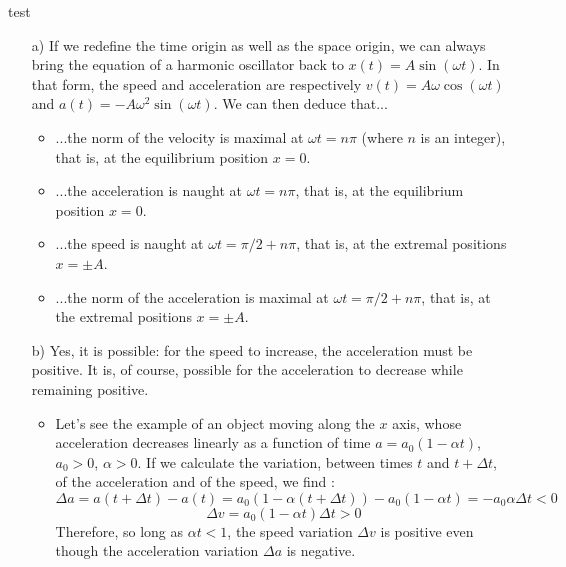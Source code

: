 %
%

\begin{center}
\vspace*{5mm}
\end{center}

test
\begin{enumerate}
\item[a)] If we redefine the time origin as well as the space origin, we can always bring the equation of a harmonic oscillator back to $x(t)=A\sin(\omega t)$. In that form, the speed and acceleration are respectively $v(t)=A\omega \cos(\omega t)$ and $a(t)=-A\omega^2\sin(\omega t)$. We can then deduce that...
\begin{itemize}
\item ...the norm of the velocity is maximal at $\omega t=n\pi$ (where $n$ is an integer), that is, at the equilibrium position $x=0$.
\item ...the acceleration is naught at  $\omega t=n\pi$, that is, at the equilibrium position $x=0$.
\item ...the speed is naught at $\omega t=\pi/2+n\pi$, that is, at the extremal positions $x=\pm A$. 
\item ...the norm of the acceleration is maximal at $\omega t=\pi/2+n\pi$, that is, at the extremal positions $x=\pm A$. 
\end{itemize}
\item[b)] Yes, it is possible: for the speed to increase, the acceleration must be positive. It is, of course, possible for the acceleration to decrease while remaining positive. 
\begin{itemize}
\item Let's see the example of an object moving along the $x$ axis, whose acceleration decreases linearly as a function of time $a=a_0(1-\alpha t)$, $a_0>0$, $\alpha >0$. If we calculate the variation, between times $t$ and   $t+\Delta t$, of the acceleration and of the speed, we find :
$$\Delta a=a(t+\Delta t)-a(t)=a_0(1-\alpha(t+\Delta t))-a_0(1-\alpha t)=-a_0 \alpha \Delta t <0$$
$$
\Delta v=a_0 (1-\alpha t)\Delta t >0  
$$
Therefore, so long as $\alpha t<1$, the speed variation $\Delta v$ is positive even though the acceleration variation $\Delta a$ is negative.


\end{itemize}
\end{enumerate}
